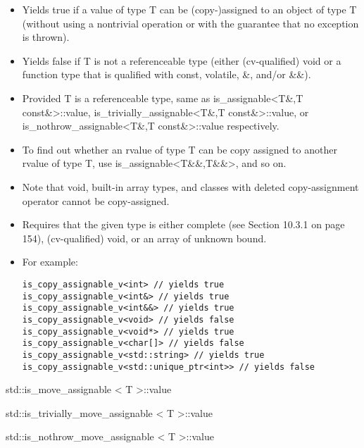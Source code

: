 \begin{itemize}
\item
Yields true if a value of type T can be (copy-)assigned to an object of type T (without using a nontrivial operation or with the guarantee that no exception is thrown).

\item
Yields false if T is not a referenceable type (either (cv-qualified) void or a function type that is qualified with const, volatile, \&, and/or \&\&).
 
\item
Provided T is a referenceable type, same as is\_assignable<T\&,T const\&>::value, is\_trivially\_assignable<T\&,T const\&>::value, or is\_nothrow\_assignable<T\&,T const\&>::value respectively.

\item
To find out whether an rvalue of type T can be copy assigned to another rvalue of type T, use is\_assignable<T\&\&,T\&\&>, and so on.


\item
Note that void, built-in array types, and classes with deleted copy-assignment operator cannot be copy-assigned.

\item
Requires that the given type is either complete (see Section 10.3.1 on page 154), (cv-qualified) void, or an array of unknown bound.

\item
For example:
\begin{lstlisting}[style=styleCXX]
is_copy_assignable_v<int> // yields true
is_copy_assignable_v<int&> // yields true
is_copy_assignable_v<int&&> // yields true
is_copy_assignable_v<void> // yields false
is_copy_assignable_v<void*> // yields true
is_copy_assignable_v<char[]> // yields false
is_copy_assignable_v<std::string> // yields true
is_copy_assignable_v<std::unique_ptr<int>> // yields false
\end{lstlisting}
\end{itemize}

std::is\_move\_assignable < T >::value

std::is\_trivially\_move\_assignable < T >::value

std::is\_nothrow\_move\_assignable < T >::value

